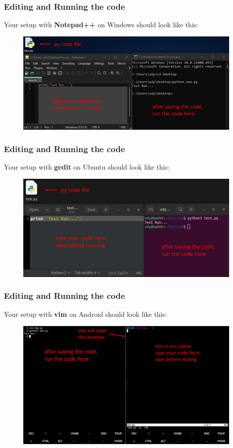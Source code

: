 \documentclass{beamer}
\begin{document}
\begin{frame}
\frametitle{Editing and Running the code}
Your setup with \textbf{Notepad++} on Windows should look like this:
\begin{figure}[H]
\centering
\includegraphics[width=\textwidth]{images/0_windows-notepad++.png}
\end{figure}
\end{frame}

\begin{frame}
\frametitle{Editing and Running the code}
Your setup with \textbf{gedit} on Ubuntu should look like this:
\begin{figure}[H]
\centering
\includegraphics[width=\textwidth]{images/0_ubuntu-gedit.png}
\end{figure}
\end{frame}

\begin{frame}
\frametitle{Editing and Running the code}
Your setup with \textbf{vim} on Android should look like this:
\begin{figure}[H]
\centering
\includegraphics[width=\textwidth]{images/0_android-vim.png}
\end{figure}
\end{frame}
\end{document}
